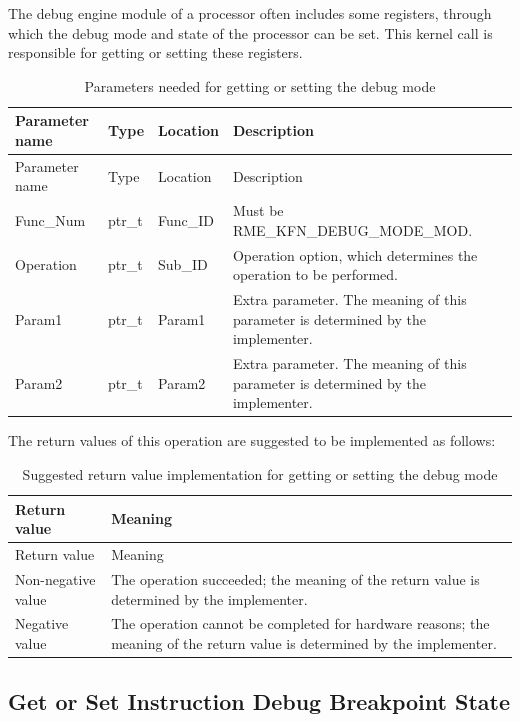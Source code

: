The debug engine module of a processor often includes some registers, through which the debug mode and state of the processor can be set. This kernel call is responsible for getting or setting these registers.

\begin{xltabular}{\textwidth}{@{}>{\hsize\raggedright\arraybackslash}X>{\hsize\raggedright\arraybackslash}X>{\hsize\raggedright\arraybackslash}X>{\hsize\raggedright\arraybackslash}X@{}}
\caption{Parameters needed for getting or setting the debug mode}\label{tab:8-117-get-or-set-debug-mode-parameters}\\
\toprule
Parameter name & Type & Location & Description\tabularnewline
\endfirsthead
\toprule
Parameter name & Type & Location & Description\tabularnewline
\midrule
\endhead
\bottomrule
\endlastfoot
Func\_Num & ptr\_t & Func\_ID & Must be RME\_KFN\_DEBUG\_MODE\_MOD.\tabularnewline
Operation & ptr\_t & Sub\_ID &
Operation option, which determines the operation to be performed.\tabularnewline
Param1 & ptr\_t & Param1 &
Extra parameter. The meaning of this parameter is determined by the implementer.\tabularnewline
Param2 & ptr\_t & Param2 &
Extra parameter. The meaning of this parameter is determined by the implementer.\tabularnewline
\end{xltabular}
\nopagebreak[4]

The return values of this operation are suggested to be implemented as follows:

\begin{xltabular}{\textwidth}{@{}>{\hsize\raggedright\arraybackslash}X>{\hsize\raggedright\arraybackslash}X@{}}
\caption{Suggested return value implementation for getting or setting the debug mode}\label{tab:8-118-get-or-set-debug-mode-suggested-return-values}\\
\toprule
Return value & Meaning\tabularnewline
\endfirsthead
\toprule
Return value & Meaning\tabularnewline
\midrule
\endhead
\bottomrule
\endlastfoot
    Non-negative value & The operation succeeded; the meaning of the return value is determined by the implementer.\tabularnewline
    Negative value & The operation cannot be completed for hardware reasons; the meaning of the return value is determined by the implementer.\tabularnewline
\end{xltabular}
\nopagebreak[4]

\subsection{Get or Set Instruction Debug Breakpoint State}\label{subsec:8-get-or-set-instruction-breakpoint-state}

